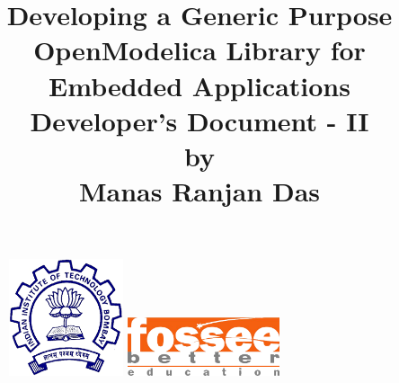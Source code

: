 \documentclass[12pt,a4paper]{report}
\begin{document}
\begin{figure}
\centering
\includegraphics[width = 0.3\textwidth]{iit}
\hspace{1cm}
\includegraphics[width = 0.4\textwidth]{fossee-logo}
\end{figure}

\title{\textbf{\textbf{Developing a Generic Purpose OpenModelica Library for Embedded Applications}}\vspace{5mm}\\
\vspace{5mm} \large Developer's Document - II\vspace{5mm} \\ \vspace{5mm}\small by\\  \vspace{1mm}  \large \textbf{Manas Ranjan Das}\\ \vspace{5mm} 
}

\maketitle

\tableofcontents
\listoffigures
\end{document}

